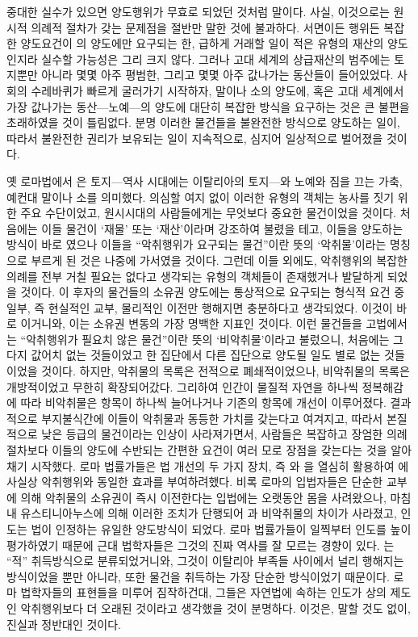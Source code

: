 중대한 실수가 있으면 양도행위가 무효로 되었던 것처럼 말이다.
사실, 이것으로는 원시적 의례적 절차가 갖는 문제점을 절반만 말한 것에 불과하다.
서면이든 행위든 복잡한 양도요건이 의 양도에만 요구되는 한,
급하게 거래할 일이 적은 유형의 재산의 양도인지라
실수할 가능성은 그리 크지 않다.
그러나 고대 세계의 상급재산의 범주에는
토지뿐만 아니라 몇몇 아주 평범한, 그리고 몇몇 아주 값나가는 동산들이
들어있었다.
사회의 수레바퀴가 빠르게 굴러가기 시작하자,
말이나 소의 양도에, 혹은
고대 세계에서 가장 값나가는 동산---노예---의
양도에 대단히 복잡한 방식을 요구하는 것은
큰 불편을 초래하였을 것이 틀림없다.
분명
이러한 물건들을 불완전한 방식으로 양도하는 일이,
따라서 불완전한 권리가 보유되는 일이
지속적으로, 심지어 일상적으로 벌어졌을 것이다.

옛 로마법에서 은 토지---역사 시대에는 이탈리아의 토지---와
노예와 짐을 끄는 가축, 예컨대 말이나 소를 의미했다.
의심할 여지 없이 이러한 유형의 객체는 농사를 짓기 위한 주요 수단이었고,
원시시대의 사람들에게는 무엇보다 중요한 물건이었을 것이다.
처음에는 이들 물건이 `재물' 또는 `재산'이라며 강조하여 불렸을 테고,
이들을 양도하는 방식이 바로 였으나
이들을 ``악취행위가 요구되는 물건''이란 뜻의
`악취물'이라는 명칭으로 부르게 된 것은 나중에 가서였을 것이다.
그런데 이들 외에도,
악취행위의 복잡한 의례를 전부 거칠 필요는 없다고 생각되는
유형의 객체들이 존재했거나 발달하게 되었을 것이다.
이 후자의 물건들의 소유권 양도에는
통상적으로 요구되는 형식적 요건 중 일부,
즉 현실적인 교부, 물리적인 이전만 행해지면 충분하다고 생각되었다.
이것이 바로 이거니와,
이는 소유권 변동의 가장 명백한 지표인 것이다.
이런 물건들을 고법에서는
``악취행위가 필요치 않은 물건''이란 뜻의
`비악취물'이라고 불렀으니,
처음에는 그다지 값어치 없는 것들이었고
한 집단에서 다른 집단으로 양도될 일도 별로 없는 것들이었을 것이다.
하지만, 악취물의 목록은 전적으로 폐쇄적이었으나,
비악취물의 목록은 개방적이었고 무한히 확장되어갔다.
그리하여 인간이 물질적 자연을 하나씩 정복해감에 따라
비악취물은 항목이 하나씩 늘어나거나
기존의 항목에 개선이 이루어졌다.
결과적으로 부지불식간에
이들이 악취물과 동등한 가치를 갖는다고 여겨지고, 따라서
본질적으로 낮은 등급의 물건이라는 인상이 사라져가면서,
사람들은 복잡하고 장엄한 의례절차보다
이들의 양도에 수반되는 간편한 요건이 여러 모로 장점을 갖는다는 것을
알아채기 시작했다.
로마 법률가들은
법 개선의 두 가지 장치,
즉 와 을
열심히 활용하여
에 사실상 악취행위와 동일한 효과를 부여하려했다.
비록 로마의 입법자들은
단순한 교부에 의해
악취물의 소유권이
즉시 이전한다는 입법에는
오랫동안 몸을 사려왔으나,
마침내 유스티니아누스에 의해 이러한 조치가 단행되어
과 비악취물의 차이가 사라졌고,
인도는 법이 인정하는 유일한 양도방식이 되었다.
로마 법률가들이 일찍부터
인도를 높이 평가하였기 때문에
근대 법학자들은 그것의 진짜 역사를 잘 모르는 경향이 있다.
는 ``적'' 취득방식으로 분류되었거니와,
그것이 이탈리아 부족들 사이에서 널리 행해지는 방식이었을 뿐만 아니라,
또한 물건을 취득하는 가장 단순한 방식이었기 때문이다.
로마 법학자들의 표현들을 미루어 짐작하건대,
그들은 자연법에 속하는 인도가 상의 제도인 악취행위보다
더 오래된 것이라고 생각했을 것이 분명하다.
이것은, 말할 것도 없이, 진실과 정반대인 것이다.

